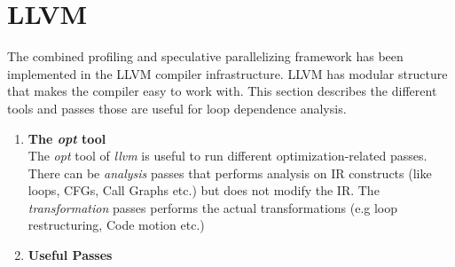 \documentclass[10pt]{report}          %
\begin{document}
\section{LLVM}
\label{sec:llvm}

The combined profiling and speculative parallelizing framework has been implemented in the LLVM compiler infrastructure.  LLVM has modular structure that makes the compiler easy to work with.  This section describes the different tools and passes those are useful for loop dependence analysis.

\begin{enumerate}

\item \textbf{The \textit{opt} tool}\\
The \textit{opt} tool of \textit{llvm} is useful to run different optimization-related passes.  There can be \textit{analysis} passes that performs analysis on IR constructs (like loops, CFGs, Call Graphs etc.) but does not modify the IR. The \textit{transformation} passes performs the actual transformations (e.g loop restructuring, Code motion etc.)
\item \textbf{Useful Passes}\\


\end{enumerate}
\end{document}
